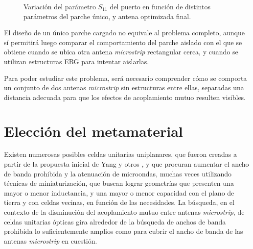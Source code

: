 \begin{figure}[H]
	\centering 
	\hspace{30pt}
	\caption{Variación del parámetro $S_{11}$ del puerto en función de distintos parámetros del parche único, y antena optimizada final.}
	\label{fig:simulaciones-microstrip-1parchecargado}
\end{figure}


El diseño de un único parche cargado no equivale al problema completo, aunque sí permitirá luego comparar el comportamiento del parche aislado con el que se obtiene cuando se ubica otra antena \textit{microstrip} rectangular cerca, y cuando se utilizan estructuras EBG para intentar aislarlas.

Para poder estudiar este problema, será necesario comprender cómo se comporta un conjunto de dos antenas \textit{microstrip} sin estructuras entre ellas, separadas una distancia adecuada para que los efectos de acoplamiento mutuo resulten visibles.




\section{Elección del metamaterial}
\label{sec_eleccion}

Existen numerosas posibles celdas unitarias uniplanares, que fueron creadas a partir de la propuesta inicial de Yang y otros \cite{Yang:UCPBG}, y que procuran aumentar el ancho de banda prohibida y la atenuación de microondas, muchas veces utilizando técnicas de miniaturización, que buscan lograr geometrías que presenten una mayor o menor inductancia, y una mayor o menor capacidad con el plano de tierra y con celdas vecinas, en función de las necesidades. La búsqueda, en el contexto de la disminución del acoplamiento mutuo entre antenas \textit{microstrip}, de celdas unitarias ópticas gira alrededor de la búsqueda de anchos de banda prohibida lo suficientemente amplios como para cubrir el ancho de banda de las antenas \textit{microstrip} en cuestión.

